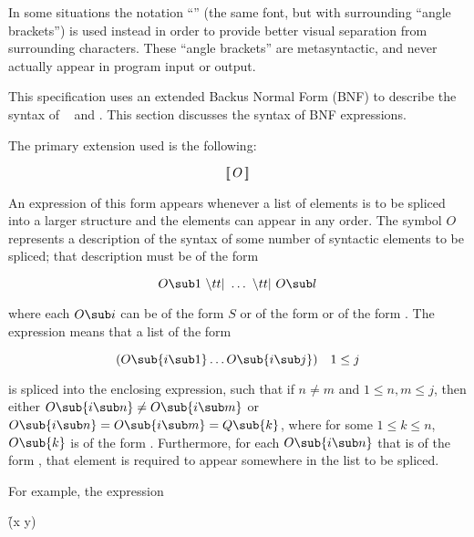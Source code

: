 In some situations the notation ``'' (\ie the same font,
but with surrounding ``angle brackets'') is used instead in order to
provide better visual separation from surrounding characters.  These
``angle brackets'' are metasyntactic, and never actually appear in program
input or output.

\endlist

\endsubsubsection%

This specification uses an extended Backus Normal Form (BNF) to
describe the syntax of \clisp\  and .
This section discusses the syntax of BNF expressions.


The primary extension used is the following:

$$\hbox{\interleave{$O$}}$$

An expression of this form appears whenever a list of elements is
to be spliced into a larger structure and the elements can appear in
any order. The symbol $O$ represents a description of the syntax of
some number of syntactic elements to be spliced; that description must
be of the form

$$O\sub 1\ \vert\ \ldots\ \vert\ O\sub l$$

\noindent where each $O\sub i$ can be of the form $S$ or of
the form  or of the form .
The expression  means that a list of the form

$$(O\sub{i\sub 1}\ldots O\sub{i\sub j})\quad 1\leq j$$

\noindent is spliced into the enclosing expression,
such that if $n \neq m$ and $1\leq n,m\leq j$,
then either $O\sub{i\sub n}\neq O\sub{i\sub m}$
         or $O\sub{i\sub n} = O\sub{i\sub m} = Q\sub{k}$, 
where for some $1\leq k \leq n$, $O\sub{k}$ is of the form .
Furthermore, for each $O\sub{i\sub n}$ that is of the form ,
that element is required to appear somewhere in the list to be spliced.

For example, the expression

\f{(x  y)}


